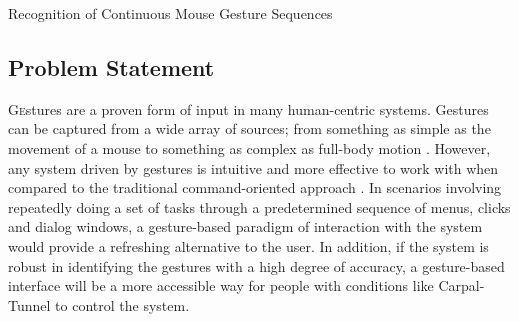 \documentclass[twoside]{article}
\begin{document}
\centerline{Recognition of Continuous Mouse Gesture Sequences}
\normalsize


\begin{multicols}{2} %

\section{Problem Statement}


\lettrine[nindent=0em,lines=2]{G}estures are a proven form of input in many
human-centric systems. Gestures can be captured from a wide array of sources; from 
something as simple as the movement of a mouse to something as complex as full-body motion \cite{mitra_gesture_2007}.
However, any system driven by gestures is intuitive and more effective to work with
when compared to the traditional command-oriented approach \cite{nielsen_noncommand_1993}. In scenarios involving repeatedly doing a set of tasks through a predetermined sequence of menus, clicks and dialog windows, a gesture-based paradigm of interaction with the system would provide a refreshing alternative to the user. In addition, if the system is robust in identifying the gestures with a high degree of accuracy, a gesture-based interface will be a more accessible way for people with conditions like Carpal-Tunnel to control the system.


\end{multicols}
\end{document}
